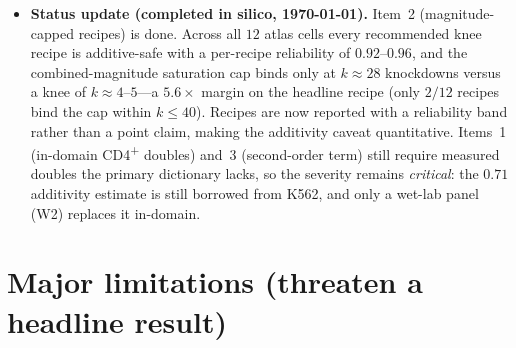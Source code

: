 \documentclass[11pt]{article}
\begin{document}
\begin{itemize}
\begin{enumerate}
from an assumption into a modeled, bounded residual.
\end{enumerate}
\item[] \textbf{Status update (completed in silico, \today).} Item~2 (magnitude-capped recipes)
is done. Across all $12$ atlas cells every recommended knee recipe is additive-safe with a
per-recipe reliability of $0.92$--$0.96$, and the combined-magnitude saturation cap binds only
at $k\approx28$ knockdowns versus a knee of $k\approx4$--$5$---a $5.6\times$ margin on the
headline recipe (only $2/12$ recipes bind the cap within $k\le40$). Recipes are now reported
with a reliability band rather than a point claim, making the additivity caveat quantitative.
Items~1 (in-domain CD4\textsuperscript{+} doubles) and~3 (second-order term) still require
measured doubles the primary dictionary lacks, so the severity remains \emph{critical}: the
$0.71$ additivity estimate is still borrowed from K562, and only a wet-lab panel (W2) replaces
it in-domain.
\end{itemize}

\section{Major limitations (threaten a headline result)}
\end{document}
